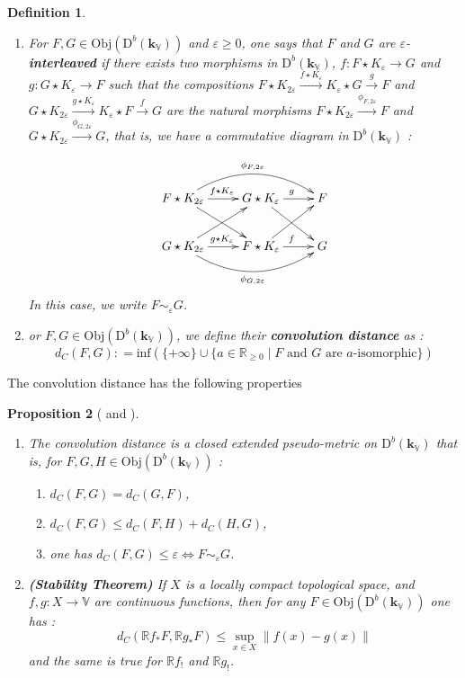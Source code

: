 \documentclass[a4paper, english, 11pt]{article}
\newcommand{\kk}[0]{\textbf{k}}
\newcommand{\0}{\vec{0}}
\newcommand{\R}[0]{\mathbb{R}}
\newcommand{\V}[0]{\mathbb{V}}
\newcommand{\D}[0]{\text{D}}
\newcommand{\Obj}[0]{\text{Obj}}
\newtheorem{prop}{Proposition}[section]
\newtheorem{defi}[prop]{Definition}
\begin{document}
\begin{defi}\label{D:inteleavingconvolution}
\begin{enumerate}\item For $F,G\in \Obj(\D^b(\kk_\V))$ and $\varepsilon\geq 0$, one says that $F$ and $G$
are $\varepsilon$-\textbf{interleaved} if there exists two morphisms in $\D^b(\kk_\V)$, $f : F\star K_\varepsilon \to G$ 
and $g :  G \star K_\varepsilon \to F$ such that the compositions
$F\star K_{2\varepsilon} \stackrel{ f\star K_\varepsilon}{\longrightarrow}K_\varepsilon\star G \stackrel{g}{\longrightarrow} F $ and $G\star K_{2\varepsilon} \stackrel{g \star K_\varepsilon}{\longrightarrow}K_\varepsilon\star F \stackrel{f}{\longrightarrow} G $ are the natural morphisms $F\star K_{2\varepsilon} \stackrel{\phi_{F,2\varepsilon}}{\longrightarrow} F$ and $G\star K_{2\varepsilon} \stackrel{\phi_{G,2\varepsilon}}{\longrightarrow} G$, that is, we have a commutative diagram in $\D^b(\kk_\V)$ :

$$ \xymatrix{
F\star K_{2\varepsilon}  \ar[rd]\ar@/^0.7cm/[rr]^{\phi_{F,2\varepsilon}} \ar[r]^{f\star K_\varepsilon} & G\star K_\varepsilon  \ar[rd] \ar[r]^{g} & F\\
G \star K_{2\varepsilon}  \ar[ur]\ar@/_0.7cm/[rr]_{\phi_{G,2\varepsilon}} \ar[r]^{g\star K_\varepsilon} & F\star K_\varepsilon  \ar[ur] \ar[r]^{f} & G
   } $$ 
In this case, we write $F \sim_\varepsilon G$.
\item or $F,G\in \Obj(\D^b(\kk_\V))$, we define their \textbf{convolution distance} as : $$d_C(F,G) : = \text{inf} \left (\{ +\infty \} \cup \{a \in \R_{\geq 0 } \mid \text{$F$ and $G$ are $a$-isomorphic} \} \right )$$ \end{enumerate}
\end{defi}
The convolution distance has the following properties
\begin{prop}[\cite{KS18} and \cite{Berk18}]\label{P:StabforConv}\begin{enumerate}
\item The convolution distance is a closed extended pseudo-metric on $\D^b(\kk_\V)$ that is, for $F,G,H \in \Obj(\D^b(\kk_\V))$ : 
\begin{enumerate}
\item $d_C(F,G) = d_C(G,F)$,
\item $d_C(F,G) \leq d_C(F,H) + d_C(H,G)$,
\item  one has $d_C(F,G) \leq \varepsilon 
\iff F \sim_\varepsilon G $.
\end{enumerate}
\item \textbf{(Stability Theorem)} If $X$ is a locally compact topological space, and $f,g : X \to \V$ are continuous functions, then for any $F\in \Obj(\D^b(\kk_\V))$ one has : $$d_C(\R f_* F, \R g_* F) \leq \sup_{x\in X} \|f(x) - g(x) \|$$
and the same is true for $\R f_!$ and $\R g_!$.
\end{enumerate}
\end{prop}
\end{document}
